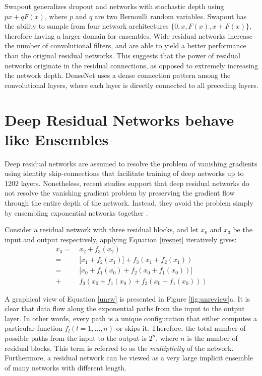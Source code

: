 \documentclass[journal]{IEEEtran}
\begin{document}
Swapout \cite{singh2016swapout} generalizes dropout \cite{srivastava2014dropout} and networks with stochastic depth \cite{huang2016deep} using $px+ qF(x)$, where $p$ and $q$ are two Bernoulli random variables. Swapout has the ability to sample from four network architectures $\{0, x, F(x), x+F(x)\}$, therefore having a larger domain for ensembles. Wide residual networks \cite{zagoruyko2016wide} increase the number of convolutional filters, and are able to yield a better performance than the original residual networks. This suggests that the power of residual networks originate in the residual connections, as opposed to extremely increasing the network depth. DenseNet \cite{huang2016densely} uses a dense connection pattern among the convolutional layers, where each layer is directly connected to all preceding layers.

\section{Deep Residual Networks behave like Ensembles}\label{sec3}


Deep residual networks \cite{he2015deep} are assumed to resolve the problem of vanishing gradients using identity skip-connections that facilitate training of deep networks up to 1202 layers. Nonetheless, recent studies support that deep residual networks do not resolve the vanishing gradient problem by preserving the gradient flow through the entire depth of the network. Instead, they avoid the problem simply by ensembling exponential networks together \cite{veit2016residual}. 



Consider a residual network with three residual blocks, and let $x_0$ and $x_3$ be the input and output respectively, applying Equation \ref{iresnet} iteratively gives:
\begin{equation}\label{unrw}
\begin{split}
x_3 =&\ x_2 + f_3(x_2) \\
    =&\ \Big[ x_1 + f_2(x_1) \Big] + f_3(x_1+f_2(x_1)) \\
    =&\ \Big[ x_0 + f_1(x_0) + f_2(x_0+f_1(x_0)) \Big] \\
    +&\ f_3(x_0 + f_1(x_0) + f_2(x_0+f_1(x_0))) 
\end{split}
\end{equation}

A graphical view of Equation \ref{unrw} is presented in Figure \ref{fig:unreview}a. It is clear that data flow along the exponential paths from the input to the output layer. In other words, every path is a unique configuration that either computes a particular function $f_l(l=1,\dots,n)$ or skips it. Therefore, the total number of possible paths from the input to the output is $2^n$, where $n$ is the number of residual blocks. This term is referred to as the \textit{multiplicity} of the network.  Furthermore, a residual network can be viewed as a very large implicit ensemble of many networks with different length.
\end{document}
